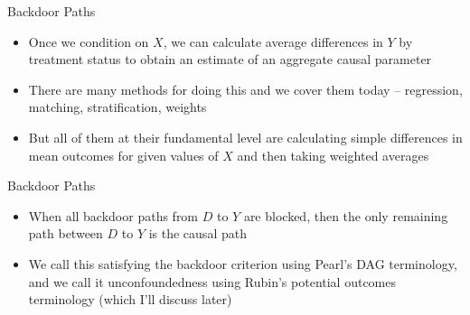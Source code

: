 \begin{frame}{Backdoor Paths}

  \begin{itemize}
    \item Once we condition on $X$, we can calculate average differences in $Y$ by treatment status to obtain an estimate of an aggregate causal parameter
    \item There are many methods for doing this and we cover them today -- regression, matching, stratification, weights
    \item But all of them at their fundamental level are calculating simple differences in mean outcomes for given values of $X$ and then taking weighted averages

  \end{itemize}

  \begin{center}
  \end{center}

\end{frame}


\begin{frame}{Backdoor Paths}

  \begin{itemize}

	\item When all backdoor paths from $D$ to $Y$ are blocked, then the only remaining path between $D$ to $Y$ is the causal path
	\item We call this satisfying the backdoor criterion using Pearl's DAG terminology, and we call it unconfoundedness using Rubin's potential outcomes terminology (which I'll discuss later)

  \end{itemize}

  \begin{center}
  \end{center}

\end{frame}








